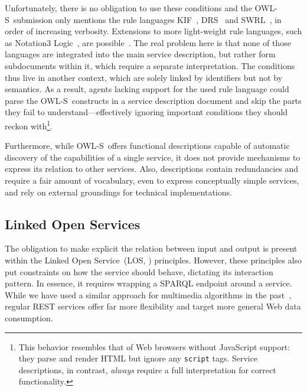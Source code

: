 \documentclass[runningheads,a4paper, twocolumn]{llncs}
\newcommand{\owls}{\mbox{OWL-S}}
\begin{document}
Unfortunately, there is no obligation to use these conditions and the \owls\ submission only mentions the rule languages KIF~\cite{KIF}, DRS~\cite{DRS} and SWRL~\cite{SWRL}, in order of increasing verbosity. Extensions to more light-weight rule languages, such as Notation3 Logic~\cite{N3Logic}, are possible~\cite{Verborgh:2010p2746}. The real problem here is that none of those languages are integrated into the main service description, but rather form subdocuments within it, which require a separate interpretation. The conditions thus live in another context, which are solely linked by identifiers but not by semantics. As a result, agents lacking support for the used rule language could parse the \owls\ constructs in a service description document and skip the parts they fail to understand---effectively ignoring important conditions they should reckon with\footnote{This behavior resembles that of Web browsers without JavaScript support: they parse and render HTML but ignore any \Verb!script! tags. Service descriptions, in contrast, {\em always} require a full interpretation for correct functionality.}.

Furthermore, while \owls\ offers functional descriptions capable of automatic discovery of the capabilities of a single service, it does not provide mechanisms to express its relation to other services. Also, descriptions contain redundancies and require a fair amount of vocabulary, even to express conceptually simple services, and rely on external groundings for technical implementations.

\subsection{Linked Open Services}
The obligation to make explicit the relation between input and output is present within the Linked Open Service~(LOS, \cite{Krummenacher:2010p5107}) principles. However, these principles also put constraints on how the service should behave, dictating its interaction pattern. In essence, it requires wrapping a SPARQL endpoint around a service. While we have used a similar approach for multimedia algorithms in the past~\cite{Verborgh:2010p2746}, regular REST services offer far more flexibility and target more general Web data consumption.
\end{document}
